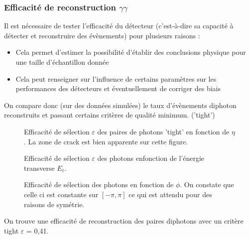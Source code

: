 \documentclass[11pt]{article} %
\begin{document}
\subsubsection{Efficacité de reconstruction $\gamma\gamma$}

Il est nécessaire de tester l'efficacité du détecteur (c'est-à-dire sa capacité à détecter et reconstruire des évènements) pour plusieurs raisons :

\begin{itemize}
\item{Cela permet d'estimer la possibilité d'établir des conclusions physique pour une taille d'échantillon donnée}
\item{Cela peut renseigner sur l'influence de certains paramètres sur les performances des détecteurs et éventuellement de corriger des biais}
\end{itemize}

On compare donc (sur des données simulées) le taux d'évènements diphoton reconstruits et passant certains critères de qualité minimum. ('tight')

\begin{figure}[H]
\centering
  \caption{Efficacité de sélection $\varepsilon$ des paires de photons 'tight' en fonction de $\eta$. La zone de \og crack \fg est bien apparente sur cette figure. }
 \resizebox{.9\linewidth}{!}{}
\end{figure}

\begin{figure}[H]
\centering
  \caption{Efficacité de sélection $\varepsilon$ des photons enfonction de l'énergie transverse $E_t$.}
 \resizebox{.9\linewidth}{!}{}
\end{figure}

\begin{figure}[H]
\centering
  \caption{}
 \resizebox{.9\linewidth}{!}{}
  \caption{Efficacité de sélection des photons en fonction de $\phi$. On constate que celle ci est constante sur $[-\pi,\pi]$ ce qui est attendu pour des raisons de symétrie.}
\end{figure}

On trouve une efficacité de reconstruction des paires diphotons avec un critère tight $\varepsilon$ = 0,41.

\end{document}
